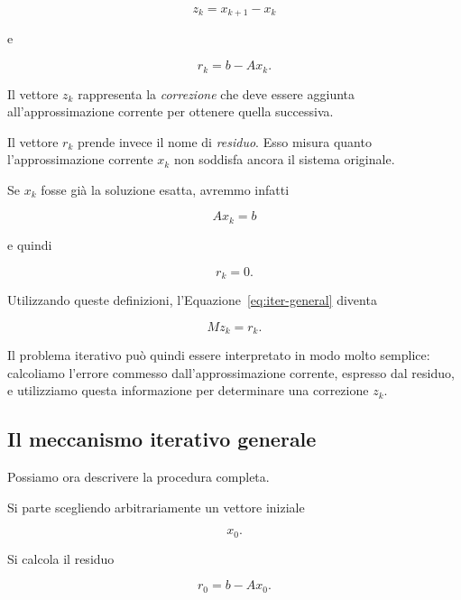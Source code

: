 \begin{equation*}
    z_k=x_{k+1}-x_k
    \label{eq:correction}
\end{equation*}

e

\begin{equation*}
    r_k=b-Ax_k.
    \label{eq:residual}
\end{equation*}

Il vettore $z_k$ rappresenta la \emph{correzione} che deve essere
aggiunta all'approssimazione corrente per ottenere quella
successiva.

Il vettore $r_k$ prende invece il nome di \emph{residuo}. Esso
misura quanto l'approssimazione corrente $x_k$ non soddisfa ancora
il sistema originale.

Se $x_k$ fosse già la soluzione esatta, avremmo infatti

\begin{equation*}
    Ax_k=b
\end{equation*}

e quindi

\begin{equation*}
    r_k=0.
\end{equation*}

Utilizzando queste definizioni, l'Equazione~\eqref{eq:iter-general}
diventa

\begin{equation*}
    Mz_k=r_k.
    \label{eq:Mzr}
\end{equation*}

Il problema iterativo può quindi essere interpretato in modo molto
semplice: calcoliamo l'errore commesso dall'approssimazione corrente,
espresso dal residuo, e utilizziamo questa informazione per
determinare una correzione $z_k$.


\subsection{Il meccanismo iterativo generale}

Possiamo ora descrivere la procedura completa.

Si parte scegliendo arbitrariamente un vettore iniziale

\begin{equation*}
    x_0.
\end{equation*}

Si calcola il residuo

\begin{equation*}
    r_0=b-Ax_0.
\end{equation*}

